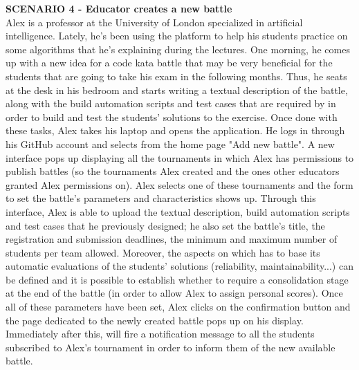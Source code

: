     \textbf{SCENARIO 4 - Educator creates a new battle}\\
    Alex is a professor at the University of London specialized in artificial intelligence. Lately, he's been using the \app platform to help his students practice on some algorithms that he's explaining during the lectures. One morning, he comes up with a new idea for a code kata battle that may be very beneficial for the students that are going to take his exam in the following months. Thus, he seats at the desk in his bedroom and starts writing a textual description of the battle, along with the build automation scripts and test cases that are required by \app in order to build and test the students' solutions to the exercise. Once done with these tasks, Alex takes his laptop and opens the \app application. He logs in through his GitHub account and selects from the home page "Add new battle". A new interface pops up displaying all the tournaments in which Alex has permissions to publish battles (so the tournaments Alex created and the ones other educators granted Alex permissions on). Alex selects one of these tournaments and the form to set the battle's parameters and characteristics shows up. Through this interface, Alex is able to upload the textual description, build automation scripts and test cases that he previously designed; he also set the battle's title, the registration and submission deadlines, the minimum and maximum number of students per team allowed. Moreover, the aspects on which \app has to base its automatic evaluations of the students' solutions (reliability, maintainability...) can be defined and it is possible to establish whether to require a consolidation stage at the end of the battle (in order to allow Alex to assign personal scores).
    Once all of these parameters have been set, Alex clicks on the confirmation button and the page dedicated to the newly created battle pops up on his display.
    Immediately after this, \app will fire a notification message to all the students subscribed to Alex's tournament in order to inform them of the new available battle.\\

